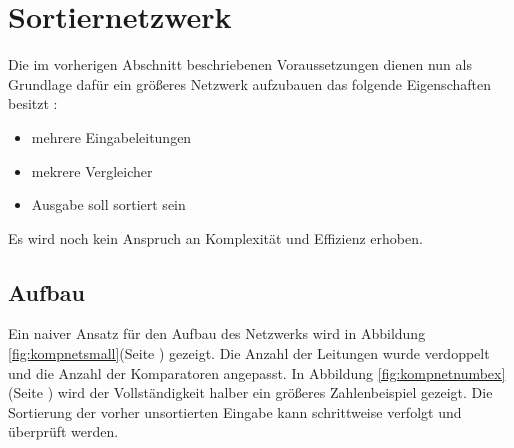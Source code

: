 \documentclass[11pt]{article}
\begin{document}
\section{Sortiernetzwerk}
Die im vorherigen Abschnitt beschriebenen Voraussetzungen dienen nun als Grundlage dafür ein größeres Netzwerk aufzubauen das folgende Eigenschaften besitzt :
\begin{itemize}
\item mehrere Eingabeleitungen
\item mekrere Vergleicher
\item Ausgabe soll sortiert sein
\end{itemize}
Es wird noch kein Anspruch an Komplexität und Effizienz erhoben.
\FloatBarrier
\subsection{Aufbau}
Ein naiver Ansatz für den Aufbau des Netzwerks wird in Abbildung \ref{fig:kompnetsmall}(Seite \pageref{fig:kompnetsmall}) gezeigt. Die Anzahl der Leitungen wurde verdoppelt und die Anzahl der Komparatoren angepasst. In Abbildung \ref{fig:kompnetnumbex} (Seite \pageref{fig:kompnetnumbex}) wird der Vollständigkeit halber ein größeres Zahlenbeispiel gezeigt. Die Sortierung der vorher unsortierten Eingabe kann schrittweise verfolgt und überprüft werden.
\end{document}
